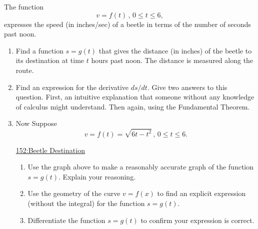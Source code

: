 \documentclass{ximera}
\begin{document}
\begin{question} \label{Q9r3r3DEDE}

The function
\[
 v =f(t) \, , \,  0\leq  t \leq 6,
\]
expresses the speed (in inches/sec) of a beetle in terms of the number of seconds past noon.

\begin{enumerate}
\item Find a function $s = g(t)$ that gives the distance (in inches) of the beetle to its destination at time $t$ hours past noon. The distance is measured along the route.

\item Find an expression for the derivative $ds/dt$. Give two answers to this question. First, an intuitive explanation that someone without any knowledge of calculus might understand. Then again, using the Fundamental Theorem.



\item Now Suppose
\[
   v =f(t) = \sqrt{6t-t^2} \, , \, 0\leq t \leq 6.
\]

\begin{onlineOnly}
    \begin{center}
\end{center}
\end{onlineOnly}

\href{https://www.desmos.com/calculator/cr9oays9zo}{152:Beetle Destination}

\begin{enumerate}

\item Use the graph above to make a reasonably accurate graph of the function $s = g(t)$. Explain your reasoning.

\item Use the geometry of the curve $v = f(x)$ to find an explicit expression
 (without the integral) for the function $s = g(t)$.

\item Differentiate the function $s = g(t)$ to confirm your expression is correct.

\end{enumerate}
\end{enumerate}

\end{question}
\end{document}
